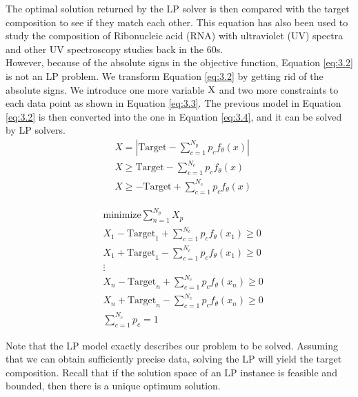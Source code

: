 The optimal solution returned by the LP solver is then compared with the target composition to see if they match each other. This equation has also been used to study the composition of Ribonucleic acid (RNA) with ultraviolet (UV) spectra \cite{NYAS:NYAS900} and other UV spectroscopy studies  \cite{LPATUAS} back in the 60s. \\

However, because of the absolute signs in the objective function, Equation \ref{eq:3.2} is not an LP problem. We transform Equation \ref{eq:3.2} by getting rid of the absolute signs. We introduce one more variable $\rm X$ and two more constraints to each data point as shown in Equation \ref{eq:3.3}. The previous model in Equation \ref{eq:3.2} is then converted into the one in Equation \ref{eq:3.4}, and it can be solved by LP solvers. \\

\begin{eqnarray} \label{eq:3.3}
& X = \left| {\text{Target}} - \displaystyle\sum^{N_{p}}_{c=1}p_{c}f_{\theta}(x) \right| \nonumber \\
&  X \geq {\text{Target}} - \displaystyle\sum^{N_{c}}_{c=1}p_{c}f_{\theta}(x)   \nonumber \\
& X \geq - {\text{Target}} + \displaystyle\sum^{N_{c}}_{c=1}p_{c}f_{\theta}(x)  
\end{eqnarray} 

\begin{eqnarray} \label{eq:3.4}
& \text{minimize} \displaystyle\sum^{N_{p}}_{n=1} X_p \nonumber \\
&  X_1 - {\text{Target}}_{1} + \displaystyle\sum^{N_{c}}_{c=1}p_{c}f_{\theta}(x_1) \geq 0 \nonumber \\
&  X_1 + {\text{Target}}_{1} - \displaystyle\sum^{N_{c}}_{c=1}p_{c}f_{\theta}(x_1) \geq 0 \nonumber \\
&\vdots  \nonumber \\
& X_n - {\text{Target}}_{n} + \displaystyle\sum^{N_{c}}_{c=1}p_{c}f_{\theta}(x_n) \geq 0 \nonumber \\
& X_n + {\text{Target}}_{n} - \displaystyle\sum^{N_{c}}_{c=1}p_{c}f_{\theta}(x_n) \geq 0 \nonumber \\
& \displaystyle\sum^{N_{c}}_{c=1}p_{c} = 1 
\end{eqnarray} 

Note that the LP model exactly describes our problem to be solved. Assuming that we can obtain sufficiently precise data, solving the LP will yield the target composition. Recall that if the solution space of an LP instance is feasible and bounded, then there is a unique optimum solution. \\

